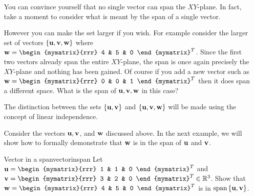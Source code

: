 You can convince yourself that no single vector can span the
$XY$-plane. In fact, take a moment to consider what is meant by the span of a single vector.

However you can make the set larger if you wish. For example consider
the larger set of vectors $\{ {\bf u}, {\bf v},
{\bf w}\}$ where $ \vect{w}=\begin{mymatrix}{rrr}
4 & 5 & 0
\end{mymatrix}^T$. 
Since
the first two vectors already span the entire $XY$-plane, the span is
once again precisely the $XY$-plane and nothing has been gained. Of
course if you add a new vector such as
$ \vect{w}=\begin{mymatrix}{rrr}
0 & 0 & 1
\end{mymatrix}^T$ then it does span a different space. What is the span of ${\bf u}, {\bf v}, {\bf w}$ in this case?   

The distinction between the sets $\{ {\bf u}, {\bf v}\}$ and $\{
{\bf u}, {\bf v}, {\bf w}\}$ will be made using the concept of linear independence. 

Consider the vectors ${\bf u}, {\bf v}$, and ${\bf w}$ discussed above. In the next example, we will show how to formally demonstrate that ${\bf w}$ is in the span of ${\bf u}$ and ${\bf v}$. 

\begin{example}{Vector in a span}{vectorinspan}
Let $\vect{u}=\begin{mymatrix}{rrr}
1  & 1 & 0
\end{mymatrix}^T$ and
$\vect{v}=\begin{mymatrix}{rrr}
3  & 2 & 0
\end{mymatrix}^T \in \R^{3}$. Show that $\vect{w} = \begin{mymatrix}{rrr}
4 & 5 & 0 
\end{mymatrix}^{T}$ is in $\mbox{span} \left\{ {\bf u}, {\bf v} \right\}$.
\end{example}

